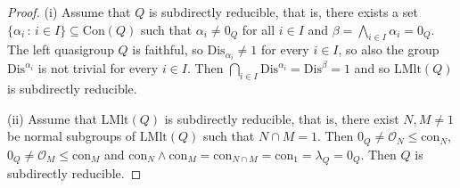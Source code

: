 \documentclass[a4paper, english, 9pt]{amsart}
\theoremstyle{plain}
\newtheorem{proposition}[theorem]{Proposition}
\theoremstyle{definition}
\def\lmlt{\mathrm{LMlt}}
\def\dis{\mathrm{Dis}}
\def\con{\mathrm{Con}}
\def\comment#1{{\color{red} #1}}
\def\c#1{\mathrm{con}_{#1}}
\def\setof#1#2{\{#1\,\colon\,#2\}}
\begin{document}
\begin{proof}
(i) Assume that $Q$ is subdirectly reducible, that is, there exists a set $\setof{\alpha_i}{i\in I}\subseteq \con(Q)$ such that $\alpha_i\neq 0_Q$ for all $i\in I$ and $\beta=\bigwedge_{i\in I} \alpha_i=0_Q$. The left quasigroup $Q$ is faithful, so $\dis_{\alpha_i}\neq 1$ for every $i\in I$, so also the group $\dis^{\alpha_i}$ is not trivial for every $i\in I$. Then $\bigcap_{i\in I} \dis^{\alpha_i}=\dis^\beta=1$ and so $\lmlt(Q)$ is subdirectly reducible. 
%
%


(ii) Assume that $\lmlt(Q)$ is subdirectly reducible, that is, there exist $N,M\neq 1$ be normal subgroups of $\lmlt(Q)$ such that $N\cap M=1$. Then $0_Q\neq \mathcal{O}_N\leq \c{N}$, $0_Q\neq \mathcal{O}_M\leq \c{M}$ and $\c{N}\wedge\c{M}=\c{N\cap M}=\c{1}= \lambda_Q=0_Q$. Then $Q$ is subdirectly reducible.
\end{proof}
\end{document}
